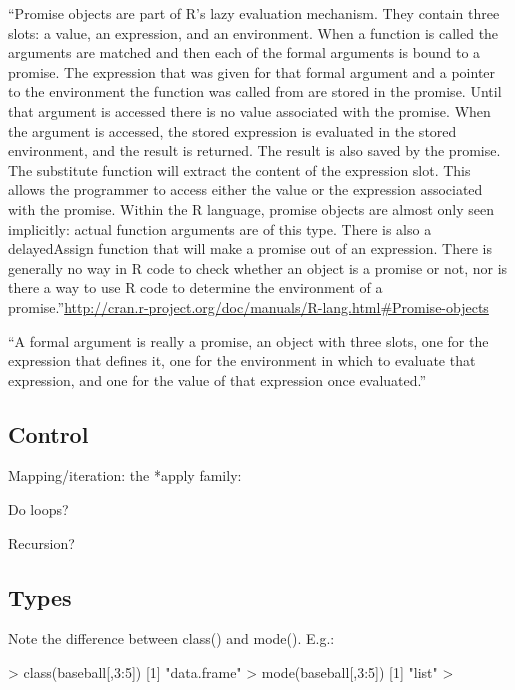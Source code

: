``Promise objects are part of R’s lazy evaluation mechanism. They contain three slots: a value, an expression, and an environment. When a function is called the arguments are matched and then each of the formal arguments is bound to a promise. The expression that was given for that formal argument and a pointer to the environment the function was called from are stored in the promise.
Until that argument is accessed there is no value associated with the promise. When the argument is accessed, the stored expression is evaluated in the stored environment, and the result is returned. The result is also saved by the promise. The substitute function will extract the content of the expression slot. This allows the programmer to access either the value or the expression associated with the promise.
Within the R language, promise objects are almost only seen implicitly: actual function arguments are of this type. There is also a delayedAssign function that will make a promise out of an expression. There is generally no way in R code to check whether an object is a promise or not, nor is there a way to use R code to determine the environment of a promise.''\url{http://cran.r-project.org/doc/manuals/R-lang.html#Promise-objects}

``A formal argument is really a promise, an object with three slots, one for the expression that defines it, one for the environment in which to evaluate that expression, and one for the value of that expression once evaluated.''


\subsection{Control}
\label{sect:rcontrol}

Mapping/iteration: the *apply family:


Do loops?

Recursion?


\subsection{Types}
\label{sect:}

\begin{ednote}
  Note the difference between class() and mode().  E.g.:

> class(baseball[,3:5])
[1] "data.frame"
> mode(baseball[,3:5])
[1] "list"
> 
\end{ednote}

